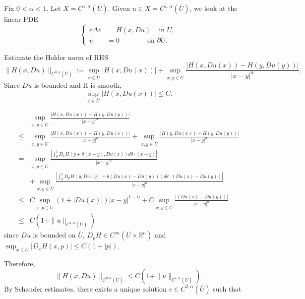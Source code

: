 \documentclass[11pt,reqno]{amsart}
\numberwithin{figure}{section}
\theoremstyle{plain}
\theoremstyle{remark}
\numberwithin{equation}{section}
\begin{document}
\begin{appendices}
Fix $0<\alpha<1$. Let $X=C^{1,\alpha}(\overline{U})$. Given $u \in X=C^{1,\alpha}(\overline{U})$, we look at the linear PDE
\begin{equation}
\label{fix}
\left\{
  \begin{aligned}
   \epsilon \Delta v &= H(x, Du) \quad \, \text{in } U, \\
              v &= 0 \qquad \qquad \text{on } \partial U.
  \end{aligned}
\right.
\end{equation}

Estimate the Holder norm of RHS
$$\|H(x, Du)\|_{C^{0, \alpha}(\overline{U})}:=\sup_{x\in\overline{U}} |H(x,Du(x))| + \sup_{x, y \in \overline{U}}\frac{|H(x, Du(x))-H(y, Du(y))|}{|x-y|^\alpha}.$$
Since $Du$ is bounded and H is smooth,
\begin{equation}
    \sup_{x\in\overline{U}} |H(x,Du(x))| \leq C.
\end{equation}

\begin{equation}
    \begin{aligned}
  &\sup_{x, y \in \overline{U}}\frac{|H(x, Du(x))-H(y, Du(y))|}{|x-y|^\alpha}\\
  \leq &  \sup_{x, y \in \overline{U}}\frac{|H(x, Du(x))-H(y, Du(x))|}{|x-y|^\alpha} + \sup_{x, y \in \overline{U}}\frac{|H(y, Du(x))-H(y, Du(y))|}{|x-y|^\alpha} \\
  =&    \sup_{x, y \in \overline{U}}\frac{|\int_0^1D_xH(y+\theta (x-y), Du(x))d\theta \cdot (x-y)|}{|x-y|^\alpha}\\& +
     \sup_{x, y \in \overline{U}}\frac{|\int_0^1D_pH(y, Du(y)+\theta (Du(x)-Du(y)))d\theta \cdot (Du(x)-Du(y))|}{|x-y|^\alpha}\\
  \leq &  C\sup_{x, y \in \overline{U}} (1+|Du(x)|)|x-y|^{1-\alpha} +  C \sup_{x, y \in \overline{U}}\frac{| (Du(x)-Du(y))|}{|x-y|^\alpha}\\
 \leq & C(1 + \|u\|_{C^{1,\alpha}(\overline{U})})
    \end{aligned}
\end{equation}
since $Du$ is bounded on $\overline{U}$, $D_pH \in C^\infty (\overline{U} \times \mathbb{R}^n)$ and
$\displaystyle \sup_{x\in U}|D_xH(x,p)|\leq C(1+|p|)$.


Therefore,
\begin{equation}
 \|H(x, Du)\|_{C^{0, \alpha}(\overline{U})} \leq C(1 + \|u\|_{C^{1,\alpha}(\overline{U})}).
\end{equation}
By Schauder estimates, there exists a unique solution $v \in C^{2,\alpha }(\overline{U})$ such that


\end{appendices}
\end{document}
